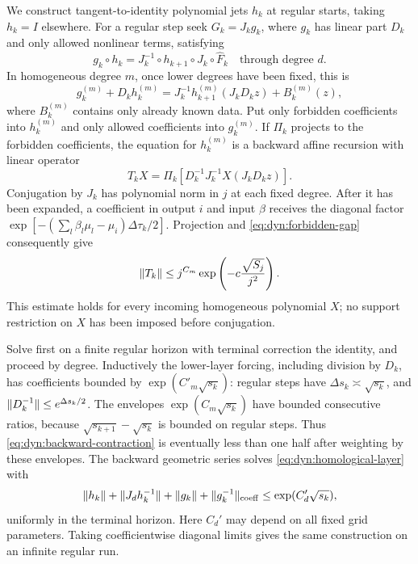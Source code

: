 We construct tangent-to-identity polynomial jets $h_k$ at regular
starts, taking $h_k=I$ elsewhere.  For a regular step seek
$G_k=J_kg_k$, where $g_k$ has linear part $D_k$ and only allowed
nonlinear terms, satisfying
\begin{equation}
 g_k\circ h_k
 =J_k^{-1}\circ h_{k+1}\circ J_k\circ\widehat F_k
 \quad\text{through degree }d.
 \label{eq:dyn:homological-identity}
\end{equation}
In homogeneous degree $m$, once lower degrees have been fixed, this
is
\begin{equation}
 g_k^{(m)}+D_kh_k^{(m)}
 =J_k^{-1}h_{k+1}^{(m)}(J_kD_kz)+B_k^{(m)}(z),
 \label{eq:dyn:homological-layer}
\end{equation}
where $B_k^{(m)}$ contains only already known data.
Put only forbidden coefficients into $h_k^{(m)}$ and only allowed
coefficients into $g_k^{(m)}$.  If $\Pi_k$ projects to the forbidden
coefficients, the equation for $h_k^{(m)}$ is a backward affine
recursion with linear operator
\begin{equation}
 T_kX=\Pi_k\left[D_k^{-1}J_k^{-1}X(J_kD_kz)\right].
 \label{eq:dyn:backward-operator}
\end{equation}
Conjugation by $J_k$ has polynomial norm in $j$ at each fixed degree.
After it has been expanded, a coefficient in output $i$ and input
$\beta$ receives the diagonal factor
$\exp[-(\sum_l\beta_l\mu_l-\mu_i)\Delta\tau_k/2]$.
Projection and \eqref{eq:dyn:forbidden-gap} consequently give
\begin{equation}
 \lVert T_k\rVert\le j^{C_m}
       \exp\left(-c\frac{\sqrt{S_j}}{j^2}\right).
 \label{eq:dyn:backward-contraction}
\end{equation}
This estimate holds for every incoming homogeneous polynomial $X$;
no support restriction on $X$ has been imposed before conjugation.

Solve first on a finite regular horizon with terminal correction the
identity, and proceed by degree.  Inductively the lower-layer forcing,
including division by $D_k$, has coefficients bounded by
$\exp(C'_m\sqrt{s_k})$: regular steps have
$\Delta s_k\asymp\sqrt{s_k}$, and
$\lVert D_k^{-1}\rVert\le e^{\Delta s_k/2}$.
The envelopes $\exp(C_m\sqrt{s_k})$ have bounded consecutive ratios,
because $\sqrt{s_{k+1}}-\sqrt{s_k}$ is bounded on regular steps.
Thus \eqref{eq:dyn:backward-contraction} is eventually less than
one half after weighting by these envelopes.  The backward geometric
series solves \eqref{eq:dyn:homological-layer} with
\begin{equation}
 \lVert h_k\rVert+\lVert J_dh_k^{-1}\rVert+\lVert g_k\rVert
       +\lVert g_k^{-1}\rVert_{\mathrm{coeff}}
 \le\exp(C_d'\sqrt{s_k}),
 \label{eq:dyn:regular-coefficients}
\end{equation}
uniformly in the terminal horizon.  Here $C_d'$ may depend on all
fixed grid parameters.  Taking coefficientwise diagonal limits gives
the same construction on an infinite regular run.

